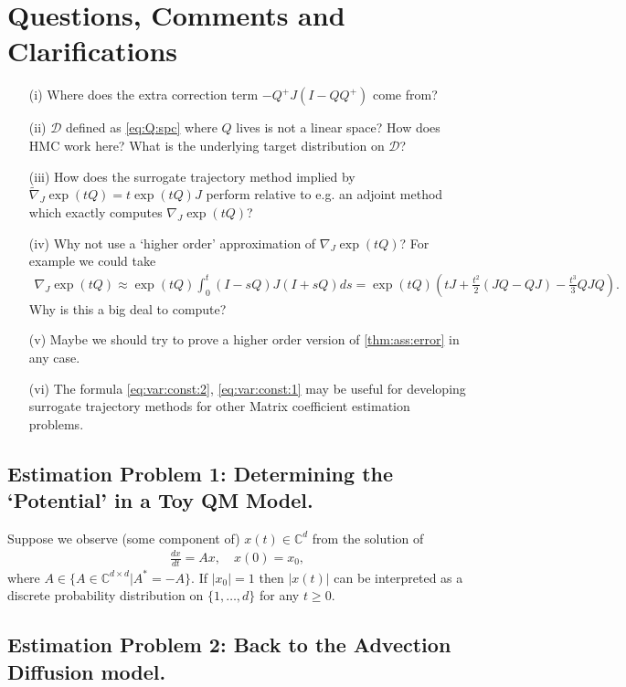 \documentclass[twoside]{article}
\numberwithin{equation}{section}
\newcommand{\CC}{\mathbb{C}}
\begin{document}
\section{Questions, Comments and Clarifications}

\begin{itemize}
\item[(i)] Where does the extra correction term $-Q^+ J (I- Q Q^+)$ come from?
\item[(ii)] $\mathcal{D}$ defined as \eqref{eq:Q:spc} where $Q$ lives is not a linear space?  How does HMC work here?  What is the underlying target distribution on $\mathcal{D}$?
\item[(iii)] How does the surrogate trajectory method implied by $\tilde{\nabla}_J \exp(t Q) = t  \exp(t Q) J$ perform relative to 
e.g. an adjoint method which exactly computes $\nabla_J \exp(t Q)$?
\item[(iv)] Why not use a `higher order' approximation of $\nabla_J \exp(t Q)$?  For example we could take
\begin{align}
	\nabla_J \exp(t Q) \approx \exp(t Q) \int_0^t (I - sQ) J (I + sQ)ds = \exp(tQ) \left(tJ + \frac{t^2}{2} (JQ - QJ) -\frac{t^3}{3} QJ Q\right).
\end{align}
Why is this a big deal to compute?
\item[(v)] Maybe we should try to prove a higher order version of \eqref{thm:ass:error} in any case.
\item[(vi)] The formula \eqref{eq:var:const:2}, \eqref{eq:var:const:1} may be useful for developing surrogate trajectory methods for other Matrix coefficient estimation problems.


\end{itemize}

\subsection{Estimation Problem 1: Determining the `Potential' in a Toy QM Model.}

Suppose we observe (some component of) $x(t) \in \CC^d$ from the solution of
\begin{align}
	\frac{d x}{dt} = A x, \quad x(0) = x_0,
\end{align}
where $A \in \{ A \in \CC^{d\times d} | A^* = -A\}$.  If $|x_0| =1$ then $|x(t)|$  can be interpreted as a discrete probability distribution on $\{1, \ldots, d\}$ for any $t \geq 0$.

\subsection{Estimation Problem 2: Back to the Advection Diffusion model.} 
\end{document}
